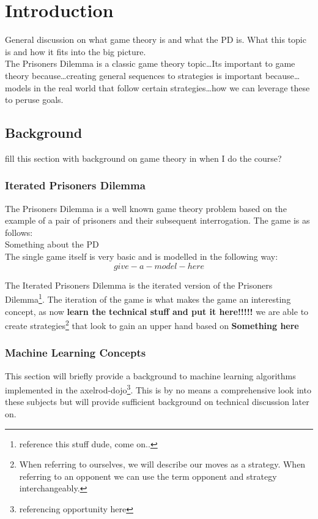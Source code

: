 
\chapter{Introduction}\label{ch:intro}

General discussion on what game theory is and what the PD is. What this topic is and how it fits into the big picture.\\

The Prisoners Dilemma is a classic game theory topic\ldots  Its important to game theory because\ldots  creating general sequences to strategies is important because\ldots  models in the real world that follow certain strategies\ldots  how we can leverage these to peruse goals.

\section{Background}
fill this section with background on game theory in when I do the course?
\subsection{Iterated Prisoners Dilemma}\label{ssec:IPD}
The Prisoners Dilemma is a well known game theory problem based on the example of a pair of prisoners and their subsequent interrogation. The game is as follows:\\

Something about the PD \\

The single game itself is very basic and is modelled in the following way: \\

\[give-a-model-here\]

The Iterated Prisoners Dilemma is the iterated version of the Prisoners Dilemma\footnote{reference this stuff dude, come on..}. The iteration of the game is what makes the game an interesting concept, as now \textbf{learn the technical stuff and put it here!!!!!} we are able to create strategies\footnote{When referring to ourselves, we will describe our moves as a strategy. When referring to an opponent we can use the term opponent and strategy interchangeably.} that look to gain an upper hand based on \textbf{Something here}


\subsection{Machine Learning Concepts}
This section will briefly provide a background to machine learning algorithms implemented in the axelrod-dojo\footnote{referencing opportunity here}. This is by no means a comprehensive look into these subjects but will provide sufficient background on technical discussion later on.
